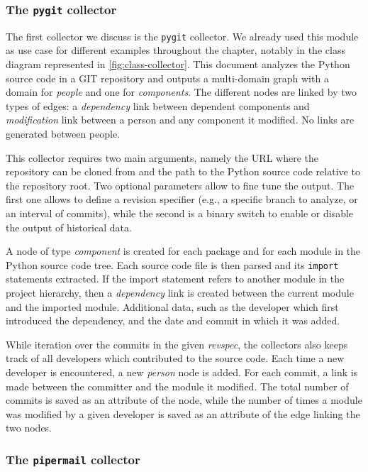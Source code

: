 \subsubsection{The \texttt{pygit} collector}

The first collector we discuss is the \texttt{pygit} collector. We already used this module as use case for different examples throughout the chapter, notably in the class diagram represented in \vref{fig:class-collector}. This document analyzes the Python source code in a GIT repository and outputs a multi-domain graph with a domain for \emph{people} and one for \emph{components}. The different nodes are linked by two types of edges: a \emph{dependency} link between dependent components and \emph{modification} link between a person and any component it modified. No links are generated between people.

This collector requires two main arguments, namely the URL where the repository can be cloned from and the path to the Python source code relative to the repository root. Two optional parameters allow to fine tune the output. The first one allows to define a revision specifier (e.g., a specific branch to analyze, or an interval of commits), while the second is a binary switch to enable or disable the output of historical data.

A node of type \emph{component} is created for each package and for each module in the Python source code tree. Each source code file is then parsed and its \texttt{import} statements extracted. If the import statement refers to another module in the project hierarchy, then a \emph{dependency} link is created between the current module and the imported module. Additional data, such as the developer which first introduced the dependency, and the date and commit in which it was added.

While iteration over the commits in the given \emph{revspec}, the collectors also keeps track of all developers which contributed to the source code. Each time a new developer is encountered, a new \emph{person} node is added. For each commit, a link is made between the committer and the module it modified. The total number of commits is saved as an attribute of the node, while the number of times a module was modified by a given developer is saved as an attribute of the edge linking the two nodes.

\subsubsection{The \texttt{pipermail} collector}

